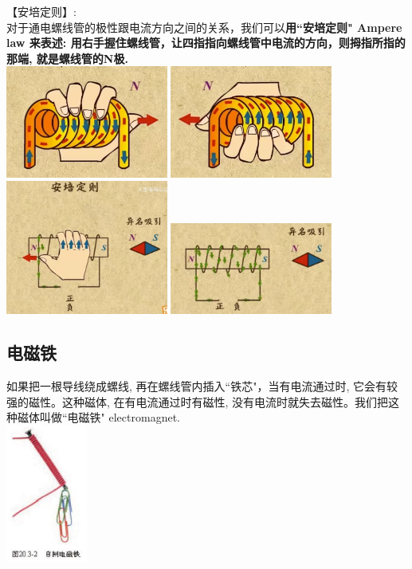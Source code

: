 \documentclass[UTF8]{ctexart}
\begin{document}
		
【安培定则】:\\
对于通电螺线管的极性跟电流方向之间的关系，我们可以\textbf{用``安培定则" Ampere law 来表述: 用右手握住螺线管，让四指指向螺线管中电流的方向，则拇指所指的那端, 就是螺线管的N极.} \\			
		\includegraphics[width=0.4\textwidth]{img/0084.png} 
		\includegraphics[width=0.4\textwidth]{img/0085.png} \\
		\includegraphics[width=0.4\textwidth]{img/0086.png} 
		\includegraphics[width=0.4\textwidth]{img/0087.png} \\
		
		
\vspace{1em} 		


\subsection{电磁铁}

	如果把一根导线绕成螺线, 再在螺线管内插入``铁芯"，当有电流通过时, 它会有较强的磁性。这种磁体, 在有电流通过时有磁性, 没有电流时就失去磁性。我们把这种磁体叫做``电磁铁" electromagnet. \\
	\includegraphics[width=0.2\textwidth]{img/0088.png}\\
	
\end{document}

